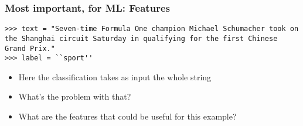 

\begin{frame}[fragile]
  \frametitle{Most important, for ML: Features}
\begin{lstlisting}
>>> text = "Seven-time Formula One champion Michael Schumacher took on the Shanghai circuit Saturday in qualifying for the first Chinese Grand Prix." 
>>> label = ``sport'' 
\end{lstlisting}
\begin{itemize}
\item Here the classification takes as input the whole string
\item What's the problem with  that?
\item What are the features that could be useful for this example?
\end{itemize}
\end{frame}

